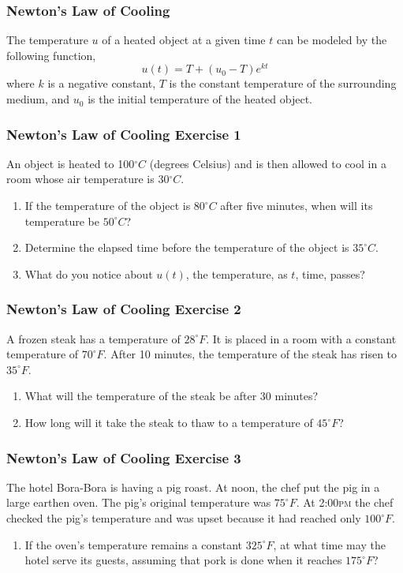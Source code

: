 \documentclass[xcolor=dvipsnames]{beamer}
\begin{document}
\begin{frame}
  \frametitle{Newton's Law of Cooling}
The temperature $u$ of a heated object at a given time $t$ can be
modeled by the following function,
\begin{equation}
  \label{eq:iemahbec}
  u(t)=T+(u_{0}-T)e^{kt}
\end{equation}
where $k$ is a negative constant, $T$ is the constant temperature of
the surrounding medium, and $u_{0}$ is the initial temperature of the
heated object.
\end{frame}

\begin{frame}
  \frametitle{Newton's Law of Cooling Exercise 1}
An object is heated to 100$^{\circ}C$ (degrees Celsius) and is then
allowed to cool in a room whose air temperature is 30$^{\circ}C$.
\begin{enumerate}
\item<1-> If the temperature of the object is $80^{\circ}C$ after five
  minutes, when will its temperature be $50^{\circ}C$?
\item<2-> Determine the elapsed time before the temperature of the
  object is $35^{\circ}C$.
\item<3-> What do you notice about $u(t)$, the temperature, as $t$,
  time, passes?
\end{enumerate}
\end{frame}

\begin{frame}
  \frametitle{Newton's Law of Cooling Exercise 2}
A frozen steak has a temperature of $28^{\circ}F$. It is placed in a
room with a constant temperature of $70^{\circ}F$. After 10 minutes,
the temperature of the steak has risen to $35^{\circ}F$. 
\begin{enumerate}
\item<1-> What will the temperature of the steak be after 30 minutes?
\item<2-> How long will it take the steak to thaw to a temperature of $45^{\circ}F$?
\end{enumerate}
\end{frame}

\begin{frame}
  \frametitle{Newton's Law of Cooling Exercise 3}
The hotel Bora-Bora is having a pig roast. At noon, the chef put the
pig in a large earthen oven. The pig's original temperature was
$75^{\circ}F$. At 2:00\textsc{pm} the chef checked the pig's
temperature and was upset because it had reached only $100^{\circ}F$.
\begin{enumerate}
\item If the oven's temperature remains a constant $325^{\circ}F$, at
  what time may the hotel serve its guests, assuming that pork is done
  when it reaches $175^{\circ}F$?
\end{enumerate}
\end{frame}
\end{document}
